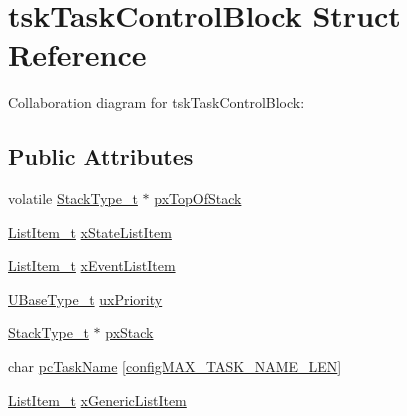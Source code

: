 \hypertarget{structtsk_task_control_block}{}\section{tsk\+Task\+Control\+Block Struct Reference}
\label{structtsk_task_control_block}


Collaboration diagram for tsk\+Task\+Control\+Block\+:
\subsection*{Public Attributes}
\begin{DoxyCompactItemize}
\item 
volatile \hyperlink{externals_2freertos_2portable_2_g_c_c_2_a_r_m___c_m0_2portmacro_8h_a84e9a8ba132feed0b2401c1f4e2ac63c}{Stack\+Type\+\_\+t} $\ast$ \hyperlink{structtsk_task_control_block_afce90c6cfcc2aab025985e0395988fec}{px\+Top\+Of\+Stack}
\item 
\hyperlink{externals_2freertos_2include_2list_8h_a1a62d469392f9bfe2443e7efab9c8398}{List\+Item\+\_\+t} \hyperlink{structtsk_task_control_block_a16e0d20425d53ac78537e1fdb8834cf6}{x\+State\+List\+Item}
\item 
\hyperlink{externals_2freertos_2include_2list_8h_a1a62d469392f9bfe2443e7efab9c8398}{List\+Item\+\_\+t} \hyperlink{structtsk_task_control_block_a1a1612b6081a13683808284d93a9b28f}{x\+Event\+List\+Item}
\item 
\hyperlink{externals_2freertos_2portable_2_g_c_c_2_a_r_m___c_m0_2portmacro_8h_a646f89d4298e4f5afd522202b11cb2e6}{U\+Base\+Type\+\_\+t} \hyperlink{structtsk_task_control_block_a79187811e3d2a15595942e3b44237d85}{ux\+Priority}
\item 
\hyperlink{externals_2freertos_2portable_2_g_c_c_2_a_r_m___c_m0_2portmacro_8h_a84e9a8ba132feed0b2401c1f4e2ac63c}{Stack\+Type\+\_\+t} $\ast$ \hyperlink{structtsk_task_control_block_a7fa5e38b946f885903d9bd4759bb50ca}{px\+Stack}
\item 
char \hyperlink{structtsk_task_control_block_a10e1ba6c6beb7c9a9bc36e4dfb567d76}{pc\+Task\+Name} \mbox{[}\hyperlink{vendor_2ceedling_2plugins_2freertos_2vendor_2freertos_2include_2_free_r_t_o_s_8h_ac388dc4041aab6997348828eb27fc1a8}{config\+M\+A\+X\+\_\+\+T\+A\+S\+K\+\_\+\+N\+A\+M\+E\+\_\+\+L\+EN}\mbox{]}
\item 
\hyperlink{externals_2freertos_2include_2list_8h_a1a62d469392f9bfe2443e7efab9c8398}{List\+Item\+\_\+t} \hyperlink{structtsk_task_control_block_af331a67daadbafd0e66098e8111cfa4b}{x\+Generic\+List\+Item}
\end{DoxyCompactItemize}


